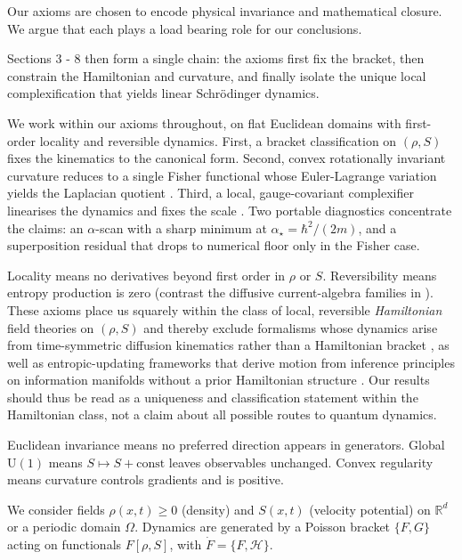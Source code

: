 \documentclass[11pt,a4paper]{article}
\numberwithin{equation}{section}
\theoremstyle{thmcompact}
\theoremstyle{remark}
\begin{document}
Our axioms are chosen to encode physical invariance and mathematical closure. We argue that each plays a load bearing role for our conclusions.

Sections 3 - 8 then form a single chain: the axioms first fix the bracket, then constrain the Hamiltonian and curvature, and finally isolate the unique local complexification that yields linear Schrödinger dynamics.

We work within our axioms throughout, on flat Euclidean domains with first-order locality and reversible dynamics.
First, a bracket classification on $(\rho,S)$ fixes the kinematics to the canonical form.
Second, convex rotationally invariant curvature reduces to a single Fisher functional whose Euler-Lagrange variation yields the Laplacian quotient \citep{fisher1925,hall2002,reginatto1998}.
Third, a local, gauge-covariant complexifier linearises the dynamics and fixes the scale \citep{madelung1927,takabayasi1952}.
Two portable diagnostics concentrate the claims: an $\alpha$-scan with a sharp minimum at $\alpha_\star=\hbar^2/(2m)$, and a superposition residual that drops to numerical floor only in the Fisher case.

Locality means no derivatives beyond first order in $\rho$ or $S$. Reversibility means entropy production is zero (contrast the diffusive current-algebra families in \citep{doebner1992,doebner1996}). These axioms place us squarely within the class of local, reversible \emph{Hamiltonian} field theories on $(\rho,S)$ and thereby exclude formalisms whose dynamics arise from time-symmetric diffusion kinematics rather than a Hamiltonian bracket \citep{nelson1966}, as well as entropic-updating frameworks that derive motion from inference principles on information manifolds without a prior Hamiltonian structure \citep{caticha2012}. Our results should thus be read as a uniqueness and classification statement within the Hamiltonian class, not a claim about all possible routes to quantum dynamics.

Euclidean invariance means no preferred direction appears in generators.
Global $\mathrm{U}(1)$
means $S\mapsto S+\text{const}$ leaves observables unchanged.
Convex regularity means curvature controls gradients and is positive.

We consider fields $\rho(x,t)\!\ge0$ (density) and $S(x,t)$ (velocity potential) on $\mathbb{R}^d$ or a periodic domain $\Omega$.
Dynamics are generated by a Poisson bracket $\{F,G\}$ acting on functionals $F[\rho,S]$, with $\dot F=\{F,\mathcal H\}$.
\end{document}

